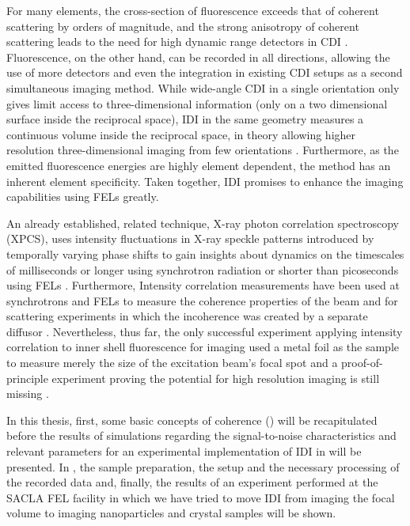 For many elements, the cross-section of fluorescence exceeds that of coherent scattering by orders of magnitude, and the strong anisotropy of coherent scattering leads to the need for high dynamic range detectors in CDI \cite{xraylib,attwood1999}.  Fluorescence, on the other hand, can be recorded in all directions, allowing the use of more detectors and even the integration in existing CDI setups as a second simultaneous imaging method. While wide-angle CDI in a single orientation only gives limit access to three-dimensional information  (only on a two dimensional surface inside the reciprocal space), IDI in the same geometry measures a continuous volume inside the reciprocal space, in theory allowing higher resolution three-dimensional imaging from few orientations \cite{barke2015,classen2017}. Furthermore, as the emitted fluorescence energies are highly element dependent, the method has an inherent element specificity. Taken together, IDI promises to enhance the imaging capabilities using FELs  greatly.

An already  established, related technique, X-ray photon correlation spectroscopy (XPCS), uses intensity fluctuations in X-ray speckle patterns introduced by temporally varying phase shifts to gain insights about dynamics on the timescales of milliseconds or longer using synchrotron radiation or shorter than picoseconds using FELs \cite{lehmkuhler2021,grubel2007}. Furthermore, Intensity correlation measurements have been used at synchrotrons and FELs to measure the coherence properties of the beam and for scattering experiments in which the incoherence was created by a separate diffusor \cite{yabashi2002,singer2013,inoue2019,gorobtsov2018,schneider2018}.  Nevertheless, thus far, the only successful experiment applying intensity correlation to inner shell fluorescence for imaging used a metal foil as the sample to measure merely the size of the excitation beam's focal spot and a proof-of-principle experiment proving the potential for high resolution imaging is still missing \cite{nakumura2020}. 

In this thesis, first, some basic concepts of coherence () will be recapitulated before the results of simulations regarding the signal-to-noise characteristics and relevant parameters for an experimental implementation of IDI in  will be presented. In , the sample preparation, the setup and the necessary processing of the recorded data and, finally, the results of an experiment performed at the SACLA FEL facility in which we have tried to move IDI from imaging the focal volume to imaging nanoparticles and crystal samples will be shown.

\cleardoublepage
